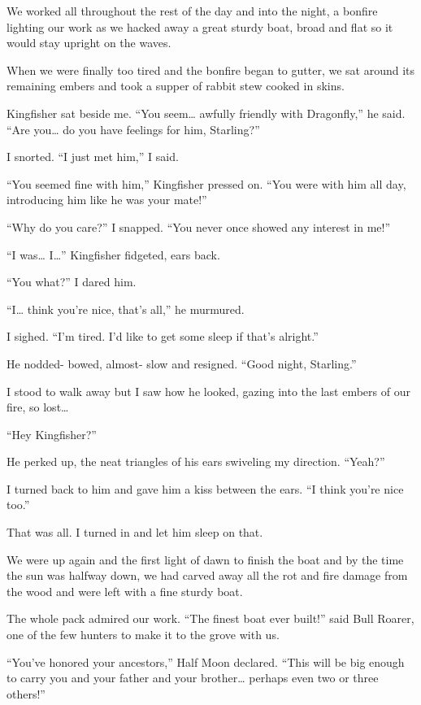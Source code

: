 We worked all throughout the rest of the day and into the night, a bonfire lighting our work as we hacked away a great sturdy boat, broad and flat so it would stay upright on the waves.

When we were finally too tired and the bonfire began to gutter, we sat around its remaining embers and took a supper of rabbit stew cooked in skins.

Kingfisher sat beside me. ``You seem\ldots{} awfully friendly with Dragonfly,'' he said. ``Are you\ldots{} do you have feelings for him, Starling?''

I snorted. ``I just met him,'' I said.

``You seemed fine with him,'' Kingfisher pressed on. ``You were with him all day, introducing him like he was your mate!''

``Why do you care?'' I snapped. ``You never once showed any interest in me!''

``I was\ldots{} I\ldots'' Kingfisher fidgeted, ears back.

``You what?'' I dared him.

``I\ldots{} think you're nice, that's all,'' he murmured.

I sighed. ``I'm tired. I'd like to get some sleep if that's alright.''

He nodded- bowed, almost- slow and resigned. ``Good night, Starling.''

I stood to walk away but I saw how he looked, gazing into the last embers of our fire, so lost\ldots{}

``Hey Kingfisher?''

He perked up, the neat triangles of his ears swiveling my direction. ``Yeah?''

I turned back to him and gave him a kiss between the ears. ``I think you're nice too.''

That was all. I turned in and let him sleep on that.

We were up again and the first light of dawn to finish the boat and by the time the sun was halfway down, we had carved away all the rot and fire damage from the wood and were left with a fine sturdy boat.

The whole pack admired our work. ``The finest boat ever built!'' said Bull Roarer, one of the few hunters to make it to the grove with us.

``You've honored your ancestors,'' Half Moon declared. ``This will be big enough to carry you and your father and your brother\ldots{} perhaps even two or three others!''

